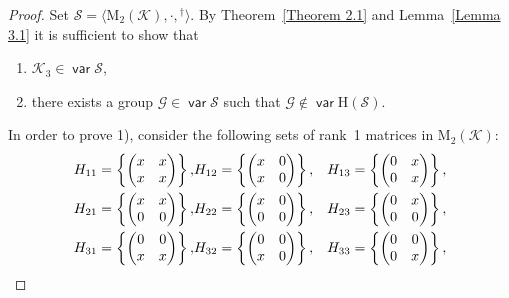\documentclass[11pt,reqno]{amsart}
\DeclareMathOperator{\var}{\mathsf{var}}
\numberwithin{equation}{section}
\theoremstyle{remark}
\def\cal{\mathcal}
\def\Sc{{\cal S}}
\def\H{\mathrm H}
\begin{document}
\begin{proof}
Set $\Sc=\langle\mathrm{M}_2(\mathcal{K}),\cdot,{}^\dag\rangle$.
By Theorem~\ref{Theorem 2.1} and Lemma~\ref{Lemma 3.1} it is
sufficient to show that
\renewcommand{\labelenumi}{\theenumi)}
\begin{enumerate}
\item $\mathcal{K}_3\in\var\Sc$,
\item there exists a group $\mathcal{G}\in\var\Sc$
such that $\mathcal{G}\notin\var\H(\Sc)$.
\end{enumerate}

In order to prove 1), consider the following sets of rank~1
matrices in $\mathrm{M}_2(\mathcal{K})$:
\begin{eqnarray}
\notag H_{11}=\left\{\begin{pmatrix} x & x\\ x &
x\end{pmatrix}\right\}, & H_{12}=\left\{\begin{pmatrix} x & 0\\ x
& 0\end{pmatrix}\right\}, & H_{13}=\left\{\begin{pmatrix}
0 & x\\ 0 & x\end{pmatrix}\right\}, \\
\label{C3 is in M2} H_{21}=\left\{\begin{pmatrix} x & x\\ 0 &
0\end{pmatrix}\right\}, & H_{22}=\left\{\begin{pmatrix} x & 0\\ 0
& 0\end{pmatrix}\right\}, & H_{23}=\left\{\begin{pmatrix}
0 & x\\ 0 & 0\end{pmatrix}\right\},\\
\notag H_{31}=\left\{\begin{pmatrix} 0 & 0\\ x &
x\end{pmatrix}\right\}, & H_{32}=\left\{\begin{pmatrix} 0 & 0\\ x
& 0\end{pmatrix}\right\}, & H_{33}=\left\{\begin{pmatrix} 0 & 0\\
0 & x\end{pmatrix}\right\},
\end{eqnarray}

\end{proof}
\end{document}
